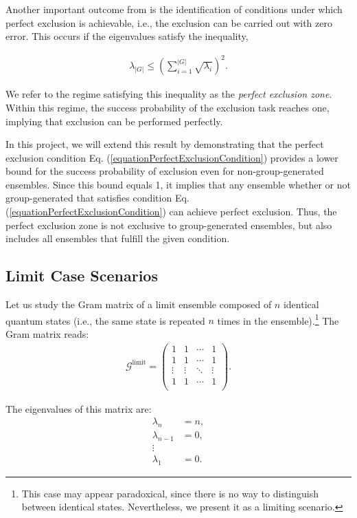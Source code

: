 \documentclass[12pt,letterpaper]{article}
\begin{document}
\begin{multicols}{2}
Another important outcome from \cite{MainPaper} is the identification of conditions under which perfect exclusion is achievable, i.e., the exclusion can be carried out with zero error. This occurs if the eigenvalues satisfy the inequality,

\begin{align}\label{equationPerfectExclusionCondition}
	\lambda_{|G|} \leq \left( \sum_{i=1}^{|G|} \sqrt{\lambda_i} \right)^2.
\end{align}

We refer to the regime satisfying this inequality as the \emph{perfect exclusion zone}. Within this regime, the success probability of the exclusion task reaches one, implying that exclusion can be performed perfectly.

In this project, we will extend this result by demonstrating that the perfect exclusion condition Eq. (\ref{equationPerfectExclusionCondition}) provides a lower bound for the success probability of exclusion even for non-group-generated ensembles. Since this bound equals 1, it implies that any ensemble whether or not group-generated that satisfies condition Eq. (\ref{equationPerfectExclusionCondition}) can achieve perfect exclusion. Thus, the perfect exclusion zone is not exclusive to group-generated ensembles, but also includes all ensembles that fulfill the given condition.

\subsection{Limit Case Scenarios}\label{sectionLimitCaseScenarios}

Let us study the Gram matrix of a limit ensemble composed of $n$ identical quantum states (i.e., the same state is repeated $n$ times in the ensemble).\footnote{This case may appear paradoxical, since there is no way to distinguish between identical states. Nevertheless, we present it as a limiting scenario.} The Gram matrix reads:
\begin{align*}
	\mathcal{G}^{\text{limit}} = \begin{pmatrix}
 1 & 1 & \cdots & 1 \\
 1 & 1 & \cdots & 1 \\
 \vdots & \vdots & \ddots & \vdots \\
 1 & 1 & \cdots & 1 \\
\end{pmatrix}.
\end{align*}

The eigenvalues of this matrix are:
\begin{align*}
	\lambda_n &= n, \\
	\lambda_{n-1} &= 0, \\
	\vdots \\
	\lambda_1 &= 0.
\end{align*}


\end{multicols}
\end{document}
